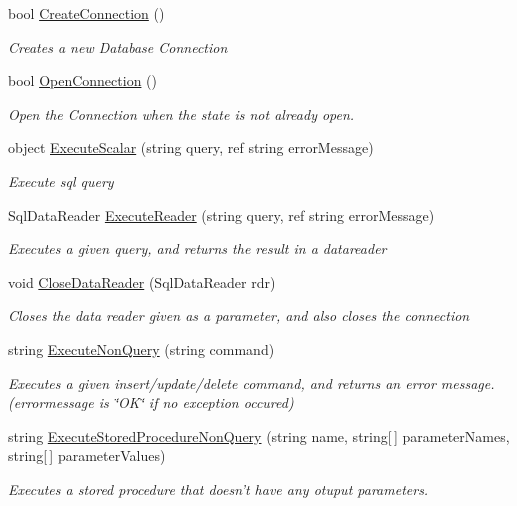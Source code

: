 \begin{DoxyCompactItemize}
\item 
bool \hyperlink{class_tune_store_1_1_model_1_1_d_a_l_ab31c1978d9d09f57793cf307807bc577}{Create\+Connection} ()
\begin{DoxyCompactList}\small\item\em Creates a new Database Connection \end{DoxyCompactList}\item 
bool \hyperlink{class_tune_store_1_1_model_1_1_d_a_l_a95012ed2fb7e4242eb95199315a86eaf}{Open\+Connection} ()
\begin{DoxyCompactList}\small\item\em Open the Connection when the state is not already open. \end{DoxyCompactList}\item 
object \hyperlink{class_tune_store_1_1_model_1_1_d_a_l_ad29e5842a6d4df190309dab55aaa6cb7}{Execute\+Scalar} (string query, ref string error\+Message)
\begin{DoxyCompactList}\small\item\em Execute sql query \end{DoxyCompactList}\item 
Sql\+Data\+Reader \hyperlink{class_tune_store_1_1_model_1_1_d_a_l_a084bc2866f85d34bdd6d4ece7f9472e3}{Execute\+Reader} (string query, ref string error\+Message)
\begin{DoxyCompactList}\small\item\em Executes a given query, and returns the result in a datareader \end{DoxyCompactList}\item 
void \hyperlink{class_tune_store_1_1_model_1_1_d_a_l_ac8f347f0d27aeadc61bc341276664290}{Close\+Data\+Reader} (Sql\+Data\+Reader rdr)
\begin{DoxyCompactList}\small\item\em Closes the data reader given as a parameter, and also closes the connection \end{DoxyCompactList}\item 
string \hyperlink{class_tune_store_1_1_model_1_1_d_a_l_a50bce22a6e2222ef51e1d79d1cb1da18}{Execute\+Non\+Query} (string command)
\begin{DoxyCompactList}\small\item\em Executes a given insert/update/delete command, and returns an error message. (errormessage is \char`\"{}\+O\+K\char`\"{} if no exception occured) \end{DoxyCompactList}\item 
string \hyperlink{class_tune_store_1_1_model_1_1_d_a_l_a2a16f122db8e86f86a8b21fffffec3ef}{Execute\+Stored\+Procedure\+Non\+Query} (string name, string\mbox{[}$\,$\mbox{]} parameter\+Names, string\mbox{[}$\,$\mbox{]} parameter\+Values)
\begin{DoxyCompactList}\small\item\em Executes a stored procedure that doesn't have any otuput parameters. \end{DoxyCompactList}\end{DoxyCompactItemize}
